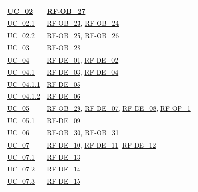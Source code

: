 \begin{longtable}{|
        >{\raggedright\arraybackslash}p{} |
        >{\raggedright\arraybackslash}p{} |
    }
    \hyperref[uc_02]{UC\_02} & \hyperlink{rf-ob_27}{RF-OB\_27} \\
    \hline
    \hyperref[uc_02.1]{UC\_02.1} & \hyperlink{rf-ob_23}{RF-OB\_23}, \hyperlink{rf-ob_24}{RF-OB\_24} \\
    \hline
    \hyperref[uc_02.2]{UC\_02.2} & \hyperlink{rf-ob_25}{RF-OB\_25}, \hyperlink{rf-ob_26}{RF-OB\_26} \\
    \hline

    \hyperref[uc_03]{UC\_03} & \hyperlink{rf-ob_28}{RF-OB\_28} \\
    \hline

    \hyperref[uc_04]{UC\_04} & \hyperlink{rf-de_1}{RF-DE\_01}, \hyperlink{rf-de_2}{RF-DE\_02} \\
    \hline
    \hyperref[uc_04.1]{UC\_04.1} & \hyperlink{rf-de_3}{RF-DE\_03}, \hyperlink{rf-de_4}{RF-DE\_04} \\
    \hline
    \hyperref[uc_04.1.1]{UC\_04.1.1} & \hyperlink{rf-de_5}{RF-DE\_05} \\
    \hline
    \hyperref[uc_04.1.2]{UC\_04.1.2} & \hyperlink{rf-de_6}{RF-DE\_06} \\
    \hline

    \hyperref[uc_05]{UC\_05} & \hyperlink{rf-ob_29}{RF-OB\_29}, \hyperlink{rf-de_7}{RF-DE\_07}, \hyperlink{rf-de_8}{RF-DE\_08}, \hyperlink{rf-op_1}{RF-OP\_1} \\
    \hline
    \hyperref[uc_05.1]{UC\_05.1} & \hyperlink{rf-de_9}{RF-DE\_09} \\
    \hline

    \hyperref[uc_06]{UC\_06} & \hyperlink{rf-ob_30}{RF-OB\_30}, \hyperlink{rf-ob_31}{RF-OB\_31} \\
    \hline

    \hyperref[uc_07]{UC\_07} & \hyperlink{rf-de_10}{RF-DE\_10}, \hyperlink{rf-de_11}{RF-DE\_11}, \hyperlink{rf-de_12}{RF-DE\_12} \\
    \hline
    \hyperref[uc_07.1]{UC\_07.1} & \hyperlink{rf-de_13}{RF-DE\_13} \\
    \hline
    \hyperref[uc_07.2]{UC\_07.2} & \hyperlink{rf-de_14}{RF-DE\_14} \\
    \hline
    \hyperref[uc_07.3]{UC\_07.3} & \hyperlink{rf-de_15}{RF-DE\_15} \\
    \hline


\end{longtable}
